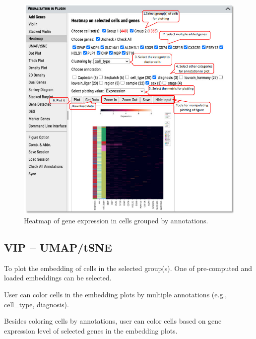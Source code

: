 \documentclass[
]{article}
\begin{document}
\begin{figure}
\centering
\includegraphics{figures/F9.jpg}
\caption{Heatmap of gene expression in cells grouped by annotations.}
\end{figure}

\hypertarget{vip-umaptsne}{%
\subsection{VIP -- UMAP/tSNE}\label{vip-umaptsne}}

To plot the embedding of cells in the selected group(s). One of pre-computed and loaded embeddings can be selected.

User can color cells in the embedding plots by multiple annotations (e.g., cell\_type, diagnosis).

Besides coloring cells by annotations, user can color cells based on gene expression level of selected genes in the embedding plots.
\end{document}
